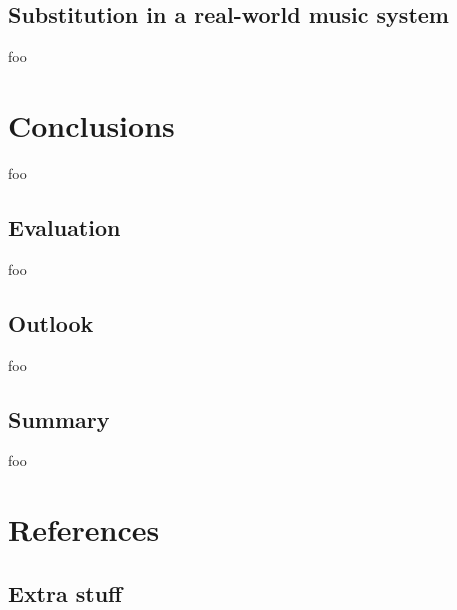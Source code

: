 \documentclass[letter,12pt,notitlepage]{article}
\begin{document}
\subsection{Substitution in a real-world music system}

foo

\vfill
\clearpage

\section{Conclusions}
\label{sec:conclusion}

foo

\subsection{Evaluation}

foo

\subsection{Outlook}

foo

\subsection{Summary}

foo

\vfill
\clearpage %

\section{References}
\printbibliography[heading=none]

\vfill
\clearpage %

\begin{appendices}

\section{Extra stuff}
\label{appendix:rthpss}

\end{appendices}
\end{document}
